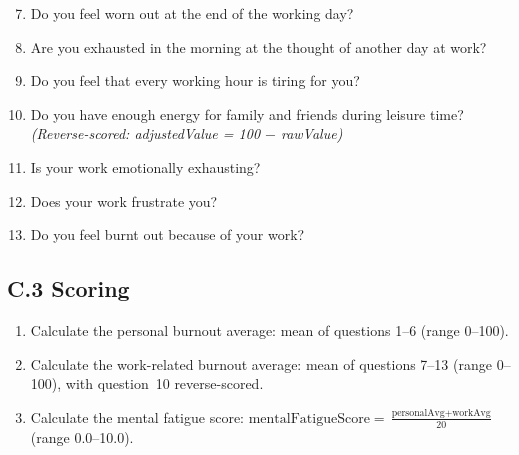 \documentclass[12pt,a4paper]{article}
\begin{document}
\begin{enumerate}
  \setcounter{enumi}{6}
  \item Do you feel worn out at the end of the working day?
  \item Are you exhausted in the morning at the thought of another day
    at work?
  \item Do you feel that every working hour is tiring for you?
  \item Do you have enough energy for family and friends during leisure
    time? \textit{(Reverse-scored: adjustedValue = 100 $-$ rawValue)}
  \item Is your work emotionally exhausting?
  \item Does your work frustrate you?
  \item Do you feel burnt out because of your work?
\end{enumerate}

\subsection*{C.3 Scoring}

\begin{enumerate}
  \item Calculate the personal burnout average: mean of questions 1--6
    (range 0--100).
  \item Calculate the work-related burnout average: mean of questions
    7--13 (range 0--100), with question~10 reverse-scored.
  \item Calculate the mental fatigue score:
    $\text{mentalFatigueScore} = \frac{\text{personalAvg} +
    \text{workAvg}}{20}$ (range 0.0--10.0).
\end{enumerate}
\end{document}
